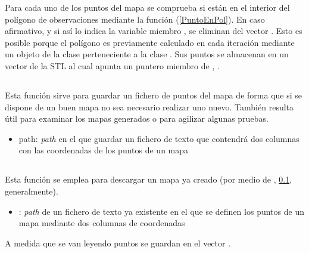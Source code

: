 Para cada uno de los puntos del mapa se comprueba si están en el interior del polígono de observaciones mediante la función  (\ref{PuntoEnPol}). En caso afirmativo, y si así lo indica la variable miembro , se eliminan del vector . Esto es posible porque el polígono es previamente calculado en cada iteración mediante un objeto de la clase  perteneciente a la clase . Sus puntos se almacenan en un vector de la STL al cual apunta un puntero miembro de , .

\subsection{}\label{GuardarMapa}


\noindent
Esta función sirve para guardar un fichero de puntos del mapa de forma que si se dispone de un buen mapa no sea necesario realizar uno nuevo. También resulta útil para examinar los mapas generados o para agilizar algunas pruebas.

\begin{itemize}
  \item path:  \emph{path} en el que guardar un fichero de texto que contendrá dos columnas con las coordenadas de los puntos de un mapa
\end{itemize}

\subsection{}


\noindent
Esta función se emplea para descargar un mapa ya creado (por medio de , \ref{GuardarMapa}, generalmente).

\begin{itemize}
  \item {}:  \emph{path} de un fichero de texto ya existente en el que se definen los puntos de un mapa mediante dos columnas de coordenadas
\end{itemize}

A medida que se van leyendo puntos se guardan en el vector .

